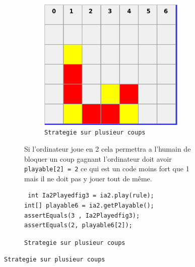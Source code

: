 \begin{figure}[H]
\begin{figure}[H]
\begin{figure}[H]
\begin{center}
  \includegraphics[scale=0.2]{playable2}
  \caption{\texttt{Strategie sur plusieur coups}}
\end{center}
\end{figure}
Si l'ordinateur joue en 2 cela permettra a l'humain de bloquer un coup gagnant 
l'ordinateur doit avoir \texttt{playable[2] = 2} ce qui est un code moins fort que 1 
mais il ne doit pas y jouer tout de même.

\begin{verbatim}
 int Ia2Playedfig3 = ia2.play(rule);
int[] playable6 = ia2.getPlayable();
assertEquals(3 , Ia2Playedfig3);
assertEquals(2, playable6[2]);
\end{verbatim}



\end{figure}
\end{figure}
